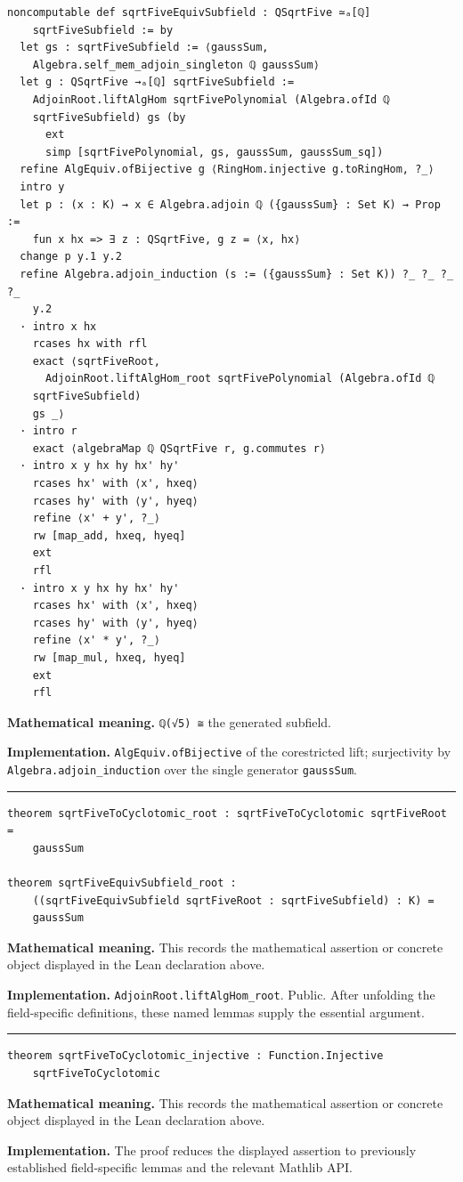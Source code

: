 \documentclass[UTF8,a4paper,11pt,fontset=fandol]{ctexart}
\theoremstyle{definition}
\newcommand{\statementsep}{\par\medskip\hrule\medskip}
\begin{document}
\begin{verbatim}
noncomputable def sqrtFiveEquivSubfield : QSqrtFive ≃ₐ[ℚ]
    sqrtFiveSubfield := by
  let gs : sqrtFiveSubfield := ⟨gaussSum,
    Algebra.self_mem_adjoin_singleton ℚ gaussSum⟩
  let g : QSqrtFive →ₐ[ℚ] sqrtFiveSubfield :=
    AdjoinRoot.liftAlgHom sqrtFivePolynomial (Algebra.ofId ℚ
    sqrtFiveSubfield) gs (by
      ext
      simp [sqrtFivePolynomial, gs, gaussSum, gaussSum_sq])
  refine AlgEquiv.ofBijective g ⟨RingHom.injective g.toRingHom, ?_⟩
  intro y
  let p : (x : K) → x ∈ Algebra.adjoin ℚ ({gaussSum} : Set K) → Prop :=
    fun x hx => ∃ z : QSqrtFive, g z = ⟨x, hx⟩
  change p y.1 y.2
  refine Algebra.adjoin_induction (s := ({gaussSum} : Set K)) ?_ ?_ ?_ ?_
    y.2
  · intro x hx
    rcases hx with rfl
    exact ⟨sqrtFiveRoot,
      AdjoinRoot.liftAlgHom_root sqrtFivePolynomial (Algebra.ofId ℚ
    sqrtFiveSubfield)
    gs _⟩
  · intro r
    exact ⟨algebraMap ℚ QSqrtFive r, g.commutes r⟩
  · intro x y hx hy hx' hy'
    rcases hx' with ⟨x', hxeq⟩
    rcases hy' with ⟨y', hyeq⟩
    refine ⟨x' + y', ?_⟩
    rw [map_add, hxeq, hyeq]
    ext
    rfl
  · intro x y hx hy hx' hy'
    rcases hx' with ⟨x', hxeq⟩
    rcases hy' with ⟨y', hyeq⟩
    refine ⟨x' * y', ?_⟩
    rw [map_mul, hxeq, hyeq]
    ext
    rfl
\end{verbatim}
\noindent\textbf{Mathematical meaning.} \texttt{ℚ(√5) ≅} the generated subfield.\par
\noindent\textbf{Implementation.} \texttt{AlgEquiv.\allowbreak{}ofBijective} of the corestricted lift; surjectivity by \texttt{Algebra.\allowbreak{}adjoin\_\allowbreak{}induction} over the single generator \texttt{gaussSum}.\par
\statementsep
\begin{verbatim}
theorem sqrtFiveToCyclotomic_root : sqrtFiveToCyclotomic sqrtFiveRoot =
    gaussSum

theorem sqrtFiveEquivSubfield_root :
    ((sqrtFiveEquivSubfield sqrtFiveRoot : sqrtFiveSubfield) : K) =
    gaussSum
\end{verbatim}
\noindent\textbf{Mathematical meaning.} This records the mathematical assertion or concrete object displayed in the Lean declaration above.\par
\noindent\textbf{Implementation.} \texttt{AdjoinRoot.\allowbreak{}liftAlgHom\_\allowbreak{}root}. Public. After unfolding the field-specific definitions, these named lemmas supply the essential argument.\par
\statementsep
\begin{verbatim}
theorem sqrtFiveToCyclotomic_injective : Function.Injective
    sqrtFiveToCyclotomic
\end{verbatim}
\noindent\textbf{Mathematical meaning.} This records the mathematical assertion or concrete object displayed in the Lean declaration above.\par
\noindent\textbf{Implementation.} The proof reduces the displayed assertion to previously established field-specific lemmas and the relevant Mathlib API.\par
\end{document}
